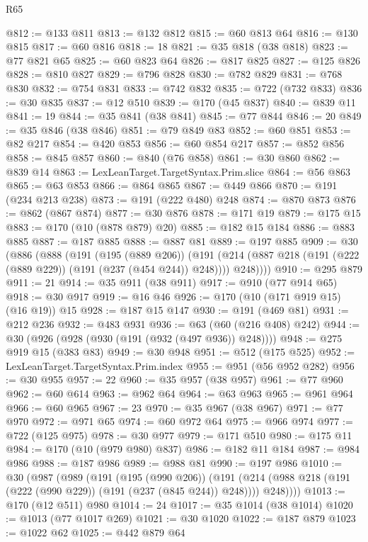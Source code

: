 \begin{lexlean}{R65}
\begin{coremodule}
@812 := @133 @811
@813 := @132 @812
@815 := @60 @813 @64
@816 := @130 @815
@817 := @60 @816
@818 := 18
@821 := @35 @818 (@38 @818)
@823 := @77 @821 @65
@825 := @60 @823 @64
@826 := @817 @825
@827 := @125 @826
@828 := @810 @827
@829 := @796 @828
@830 := @782 @829
@831 := @768 @830
@832 := @754 @831
@833 := @742 @832
@835 := @722 (@732 @833)
@836 := @30 @835
@837 := @12 @510
@839 := @170 (@45 @837)
@840 := @839 @11
@841 := 19
@844 := @35 @841 (@38 @841)
@845 := @77 @844
@846 := 20
@849 := @35 @846 (@38 @846)
@851 := @79 @849 @83
@852 := @60 @851
@853 := @82 @217
@854 := @420 @853
@856 := @60 @854 @217
@857 := @852 @856
@858 := @845 @857
@860 := @840 (@76 @858)
@861 := @30 @860
@862 := @839 @14
@863 := LexLeanTarget.TargetSyntax.Prim.slice
@864 := @56 @863
@865 := @63 @853
@866 := @864 @865
@867 := @449 @866
@870 := @191 (@234 @213 @238)
@873 := @191 (@222 @480) @248
@874 := @870 @873
@876 := @862 (@867 @874)
@877 := @30 @876
@878 := @171 @19
@879 := @175 @15
@883 := @170 (@10 (@878 @879) @20)
@885 := @182 @15 @184
@886 := @883 @885
@887 := @187 @885
@888 := @887 @81
@889 := @197 @885
@909 := @30
    (@886
      (@888
        (@191
          (@195 (@889 @206))
          (@191 (@214 (@887 @218 (@191 (@222 (@889 @229)) (@191 (@237 (@454 @244)) @248)))) @248))))
@910 := @295 @879
@911 := 21
@914 := @35 @911 (@38 @911)
@917 := @910 (@77 @914 @65)
@918 := @30 @917
@919 := @16 @46
@926 := @170 (@10 (@171 @919 @15) (@16 @19)) @15
@928 := @187 @15 @147
@930 := @191 (@469 @81)
@931 := @212 @236
@932 := @483 @931
@936 := @63 (@60 (@216 @408) @242)
@944 := @30 (@926 (@928 (@930 (@191 (@932 (@497 @936)) @248))))
@948 := @275 @919 @15 (@383 @83)
@949 := @30 @948
@951 := @512 (@175 @525)
@952 := LexLeanTarget.TargetSyntax.Prim.index
@955 := @951 (@56 @952 @282)
@956 := @30 @955
@957 := 22
@960 := @35 @957 (@38 @957)
@961 := @77 @960
@962 := @60 @614
@963 := @962 @64
@964 := @63 @963
@965 := @961 @964
@966 := @60 @965
@967 := 23
@970 := @35 @967 (@38 @967)
@971 := @77 @970
@972 := @971 @65
@974 := @60 @972 @64
@975 := @966 @974
@977 := @722 (@125 @975)
@978 := @30 @977
@979 := @171 @510
@980 := @175 @11
@984 := @170 (@10 (@979 @980) @837)
@986 := @182 @11 @184
@987 := @984 @986
@988 := @187 @986
@989 := @988 @81
@990 := @197 @986
@1010 := @30
    (@987
      (@989
        (@191
          (@195 (@990 @206))
          (@191 (@214 (@988 @218 (@191 (@222 (@990 @229)) (@191 (@237 (@845 @244)) @248)))) @248))))
@1013 := @170 (@12 @511) @980
@1014 := 24
@1017 := @35 @1014 (@38 @1014)
@1020 := @1013 (@77 @1017 @269)
@1021 := @30 @1020
@1022 := @187 @879
@1023 := @1022 @62
@1025 := @442 @879 @64

\end{coremodule}
\end{lexlean}
